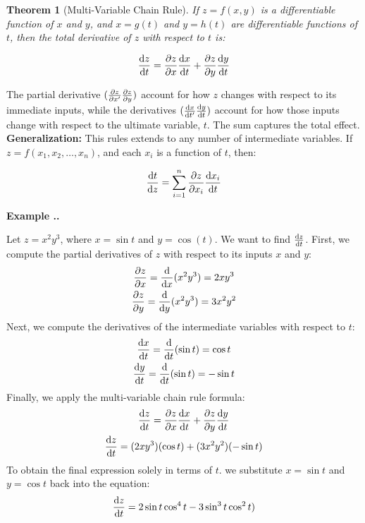 \documentclass{article}
\theoremstyle{plain}
\newtheorem{myth}{Theorem}[section]
\theoremstyle{definition}
\theoremstyle{remark}
\newcounter{myex}[myth]
\renewcommand{\themyex}{\themyth.\arabic{myex}}
\newenvironment{myex}[1][]{
  \refstepcounter{myex}%
  \par\medskip
  \noindent\textbf{Example \themyex.} #1\par
  \noindent
}{\medskip}
\begin{document}
  \begin{myth}[Multi-Variable Chain Rule]
  If $z = f(x, y)$ is a differentiable function of $x$ and $y$, and $x = g(t)$ and $y = h(t)$ are differentiable functions of $t$, then the total derivative of $z$ with respect to $t$ is:

              \[\diff{z}{t} = \diffp{z}{x}\diff{x}{t} + \diffp{z}{y}\diff{y}{t}\]
  \end{myth}

  \noindent The partial derivative $(\diffp{z}{x^\prime}  \diffp{z}{y})$
account for how $z$ changes with respect to its immediate inputs, while the
derivatives $(\diff{x}{t^\prime}  \diff{y}{t})$ account for how those inputs
change with respect to the ultimate variable, $t$. The sum captures the
total effect.\\

  \noindent \textbf{Generalization:} This rules extends to any number of
intermediate variables. If $z = f(x_1, x_2,\dots,x_n)$, and each $x_i$ is a
function of $t$, then:

            \[\diff{t}{z} = \sum_{i=1}^{n}\diffp{z}{x_i}\diff{x_i}{t} \]


  \begin{myex}
    Let $z = x^2 y^3$, where $x = \sin{t}$ and $y = \cos(t)$. We want to find $\diff{z}{t}$.
    First, we compute the partial derivatives of $z$ with respect to its
    inputs $x$ and $y$:
    \begin{gather}
      \diffp{z}{x} = \diff{}{x}(x^2 y^3) = 2xy^3\\
      \diffp{z}{y} = \diff{}{y}(x^2 y^3) = 3x^2 y^2
    \end{gather}
    Next, we compute the derivatives of the intermediate variables with
    respect to $t$:
    \begin{gather}
      \diff{x}{t} = \diff{}{t}(\sin{t}) = \cos{t}\\
      \diff{y}{t} = \diff{}{t}(\sin{t}) = -\sin{t}
    \end{gather}
    Finally, we apply the multi-variable chain rule formula:
              \begin{gather}
                  \diff{z}{t} = \diffp{z}{x}\diff{x}{t} + \diffp{z}{y}\diff{y}{t}\\
                  \diff{z}{t} = (2xy^3)(\cos{t}) + (3x^2 y^2)(-\sin{t})\\
              \end{gather}
    To obtain the final expression solely in terms of $t$. we substitute $x = \sin{t}$ and $y = \cos{t}$ back into the equation:
            \begin{gather}
              \diff{z}{t} = 2\sin{t}\cos^4{t}-3\sin^3{t}\cos^2{t})
            \end{gather}
  \end{myex}
\end{document}
